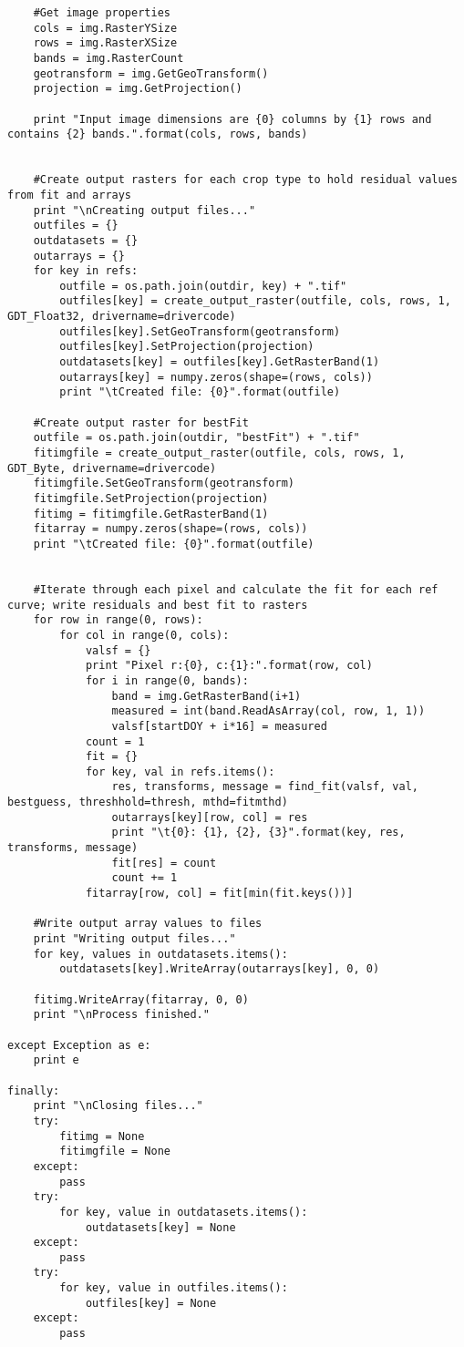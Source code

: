\begin{verbatim}
    #Get image properties
    cols = img.RasterYSize
    rows = img.RasterXSize
    bands = img.RasterCount
    geotransform = img.GetGeoTransform()
    projection = img.GetProjection()

    print "Input image dimensions are {0} columns by {1} rows and contains {2} bands.".format(cols, rows, bands)


    #Create output rasters for each crop type to hold residual values from fit and arrays
    print "\nCreating output files..."
    outfiles = {}
    outdatasets = {}
    outarrays = {}
    for key in refs:
        outfile = os.path.join(outdir, key) + ".tif"
        outfiles[key] = create_output_raster(outfile, cols, rows, 1, GDT_Float32, drivername=drivercode)
        outfiles[key].SetGeoTransform(geotransform)
        outfiles[key].SetProjection(projection)
        outdatasets[key] = outfiles[key].GetRasterBand(1)
        outarrays[key] = numpy.zeros(shape=(rows, cols))
        print "\tCreated file: {0}".format(outfile)

    #Create output raster for bestFit
    outfile = os.path.join(outdir, "bestFit") + ".tif"
    fitimgfile = create_output_raster(outfile, cols, rows, 1, GDT_Byte, drivername=drivercode)
    fitimgfile.SetGeoTransform(geotransform)
    fitimgfile.SetProjection(projection)
    fitimg = fitimgfile.GetRasterBand(1)
    fitarray = numpy.zeros(shape=(rows, cols))
    print "\tCreated file: {0}".format(outfile)


    #Iterate through each pixel and calculate the fit for each ref curve; write residuals and best fit to rasters
    for row in range(0, rows):
        for col in range(0, cols):
            valsf = {}
            print "Pixel r:{0}, c:{1}:".format(row, col)
            for i in range(0, bands):
                band = img.GetRasterBand(i+1)
                measured = int(band.ReadAsArray(col, row, 1, 1))
                valsf[startDOY + i*16] = measured
            count = 1
            fit = {}
            for key, val in refs.items():
                res, transforms, message = find_fit(valsf, val, bestguess, threshhold=thresh, mthd=fitmthd)
                outarrays[key][row, col] = res
                print "\t{0}: {1}, {2}, {3}".format(key, res, transforms, message)
                fit[res] = count
                count += 1
            fitarray[row, col] = fit[min(fit.keys())]

    #Write output array values to files
    print "Writing output files..."
    for key, values in outdatasets.items():
        outdatasets[key].WriteArray(outarrays[key], 0, 0)

    fitimg.WriteArray(fitarray, 0, 0)
    print "\nProcess finished."

except Exception as e:
    print e

finally:
    print "\nClosing files..."
    try:
        fitimg = None
        fitimgfile = None
    except:
        pass
    try:
        for key, value in outdatasets.items():
            outdatasets[key] = None
    except:
        pass
    try:
        for key, value in outfiles.items():
            outfiles[key] = None
    except:
        pass
\end{verbatim}
